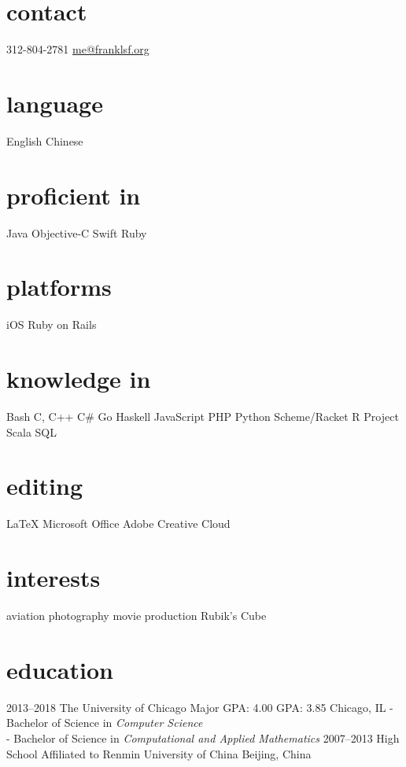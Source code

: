 



\begin{aside} %
\section{contact}
312-804-2781
\underline{me@franklsf.org}
\section{language}
English
Chinese
\section{proficient in}
Java
Objective-C
Swift
Ruby
\section{platforms}
iOS
Ruby on Rails
\section{knowledge in}
Bash
C, C++
C\#
Go
Haskell
JavaScript
PHP
Python
Scheme/Racket
R Project
Scala
SQL
\section{editing}
{\LaTeX}
Microsoft Office
Adobe Creative Cloud
\section{interests}
aviation
photography
movie production
Rubik’s Cube
\end{aside}

\section{education}

\begin{entrylist}
\entry
{2013--2018}
{The University of Chicago}
{Major GPA: 4.00\hspace{2em} GPA: 3.85\hspace{2em} Chicago, IL}
{- Bachelor of Science in \emph{Computer Science} \\
 - Bachelor of Science in \emph{Computational and Applied Mathematics}}
\entry
{2007--2013}
{High School Affiliated to Renmin University of China}
{Beijing, China}
{}
\end{entrylist}

